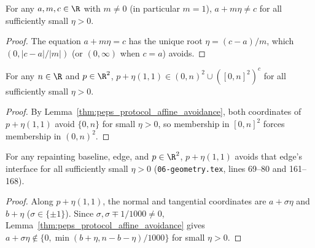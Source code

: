 \begin{lemma}
    \label{thm:peps_protocol_affine_avoidance}
    \leanok
    For any $a,m,c\in\R$ with $m\ne0$ (in particular $m=1$), $a+m\eta\ne c$ for all sufficiently small $\eta>0$.
\end{lemma}

\begin{proof}\leanok
    The equation $a+m\eta=c$ has the unique root $\eta=(c-a)/m$, which $(0,\lvert c-a\rvert/\lvert m\rvert)$ (or $(0,\infty)$ when $c=a$) avoids.
\end{proof}

\begin{lemma}
    \label{thm:peps_protocol_square_boundary_avoidance}
    \leanok
    For any $n\in\R$ and $p\in\R^2$, $p+\eta(1,1)\in(0,n)^2\cup([0,n]^2)^c$ for all sufficiently small $\eta>0$.
\end{lemma}

\begin{proof}\leanok
    By Lemma~\ref{thm:peps_protocol_affine_avoidance}, both coordinates of $p+\eta(1,1)$ avoid $\{0,n\}$ for small $\eta>0$, so membership in $[0,n]^2$ forces membership in $(0,n)^2$.
\end{proof}

\begin{lemma}
    \label{thm:peps_protocol_band_interface_avoidance}
    \leanok
    For any repainting baseline, edge, and $p\in\R^2$, $p+\eta(1,1)$ avoids that edge's interface for all sufficiently small $\eta>0$ (\texttt{06-geometry.tex}, lines 69--80 and 161--168).
\end{lemma}

\begin{proof}\leanok
    Along $p+\eta(1,1)$, the normal and tangential coordinates are $a+\sigma\eta$ and $b+\eta$ ($\sigma\in\{\pm1\}$). Since $\sigma,\sigma\mp 1/1000\ne0$, Lemma~\ref{thm:peps_protocol_affine_avoidance} gives $a+\sigma\eta\notin\{0,\min(b+\eta,n-b-\eta)/1000\}$ for small $\eta>0$.
\end{proof}

